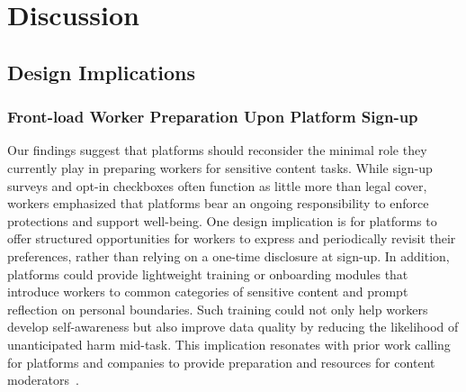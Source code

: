 \section{Discussion}


\subsection{Design Implications}
\subsubsection{Front-load Worker Preparation Upon Platform Sign-up}
Our findings suggest that platforms should reconsider the minimal role they currently play in preparing workers for sensitive content tasks. While sign-up surveys and opt-in checkboxes often function as little more than legal cover, workers emphasized that platforms bear an ongoing responsibility to enforce protections and support well-being. One design implication is for platforms to offer structured opportunities for workers to express and periodically revisit their preferences, rather than relying on a one-time disclosure at sign-up. In addition, platforms could provide lightweight training or onboarding modules that introduce workers to common categories of sensitive content and prompt reflection on personal boundaries. Such training could not only help workers develop self-awareness but also improve data quality by reducing the likelihood of unanticipated harm mid-task. This implication resonates with prior work calling for platforms and companies to provide preparation and resources for content moderators~\cite{qian2025aura, steiger_psychological_2021, steiger2022effects}. 


